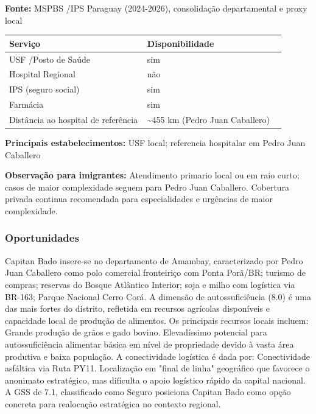 \textbf{Fonte:} MSPBS /\allowbreak  IPS Paraguay (2024-2026), consolidação
departamental e proxy local

{\def\LTcaptype{none} %
\begin{longtable}{@{}>{\raggedright\arraybackslash}p{0.45\linewidth} >{\raggedright\arraybackslash}p{0.45\linewidth}@{}}
\toprule\noalign{}
Serviço & Disponibilidade \\
\midrule\noalign{}
\endhead
\bottomrule\noalign{}
\endlastfoot
USF /\allowbreak  Posto de Saúde & sim \\
Hospital Regional & não \\
IPS (seguro social) & sim \\
Farmácia & sim \\
Distância ao hospital de referência & \textasciitilde455 km (Pedro Juan
Caballero) \\
\end{longtable}
}

\textbf{Principais estabelecimentos:} USF local; referencia hospitalar
em Pedro Juan Caballero

\textbf{Observação para imigrantes:} Atendimento primario local ou em
raio curto; casos de maior complexidade seguem para Pedro Juan
Caballero. Cobertura privada continua recomendada para especialidades e
urgências de maior complexidade.
\newpage

\subsubsection*{Oportunidades}\label{oport-capitan-bado-1303}
Capitan Bado insere-se no departamento de Amambay, caracterizado por Pedro Juan Caballero como polo comercial fronteiriço com Ponta Porã/BR; turismo de compras; reservas do Bosque Atlântico Interior; soja e milho com logística via BR-163; Parque Nacional Cerro Corá. A dimensão de autossuficiência (8.0) é uma das mais fortes do distrito, refletida em recursos agrícolas disponíveis e capacidade local de produção de alimentos. Os principais recursos locais incluem: Grande produção de grãos e gado bovino. Elevadíssimo potencial para autossuficiência alimentar básica em nível de propriedade devido à vasta área produtiva e baixa população. A conectividade logística é dada por: Conectividade asfáltica via Ruta PY11. Localização em "final de linha" geográfico que favorece o anonimato estratégico, mas dificulta o apoio logístico rápido da capital nacional. A GSS de 7.1, classificado como Seguro posiciona Capitan Bado como opção concreta para realocação estratégica no contexto regional.

